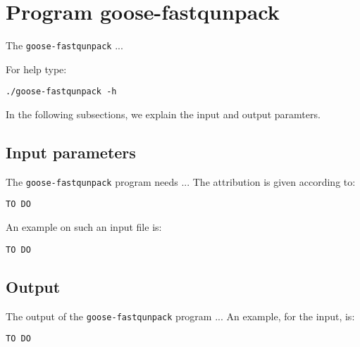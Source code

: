\section{Program goose-fastqunpack}
The \texttt{goose-fastqunpack} ...

For help type:
\begin{lstlisting}
./goose-fastqunpack -h
\end{lstlisting}
In the following subsections, we explain the input and output paramters.

\subsection{Input parameters}

The \texttt{goose-fastqunpack} program needs ...
The attribution is given according to:
\begin{lstlisting}
TO DO
\end{lstlisting}

An example on such an input file is:
\begin{lstlisting}
TO DO
\end{lstlisting}

\subsection{Output}
The output of the \texttt{goose-fastqunpack} program ...
An example, for the input, is:
\begin{lstlisting}
TO DO
\end{lstlisting}
